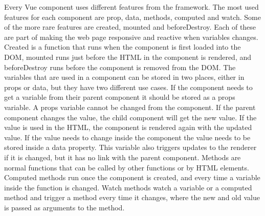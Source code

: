 Every Vue component uses different features from the framework. The most used features for each component are prop, data, methods, computed and watch. Some of the more rare features are created, mounted and beforeDestroy. Each of these are part of making the web page responsive and reactive when variables changes. Created is a function that runs when the component is first loaded into the DOM, mounted runs just before the HTML in the component is rendered, and beforeDestroy runs before the component is removed from the DOM. The variables that are used in a component can be stored in two places, either in props or data, but they have two different use cases. If the component needs to get a variable from their parent component it should be stored as a props variable. A props variable cannot be changed from the component. If the parent component changes the value, the child component will get the new value. If the value is used in the HTML, the component is rendered again with the updated value. If the value needs to change inside the component the value needs to be stored inside a data property. This variable also triggers updates to the renderer if it is changed, but it has no link with the parent component. Methods are normal functions that can be called by other functions or by HTML elements. Computed methods run once the component is created, and every time a variable inside the function is changed. Watch methods watch a variable or a computed method and trigger a method every time it changes, where the new and old value is passed as arguments to the method.
